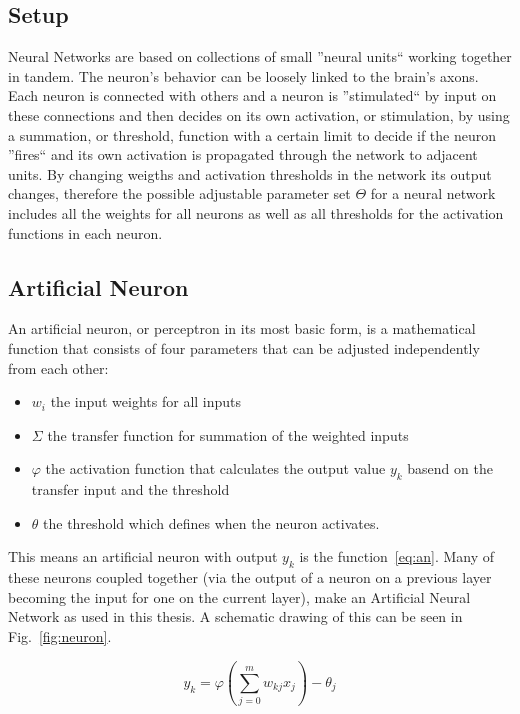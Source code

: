 \subsection{Setup}
\label{sec:fund:general}
Neural Networks are based on collections of small ''neural units``  working together in tandem. The neuron's behavior can be loosely linked to the brain's axons. Each neuron is connected with others and a neuron is ''stimulated`` by input on these connections and then decides on its own activation, or stimulation, by using a summation, or threshold, function with a certain limit to decide if the neuron ''fires`` and its own activation is propagated through the network to adjacent units. By changing weigths and activation thresholds in the network its output changes, therefore the possible adjustable parameter set \(\Theta\) for a neural network includes all the weights for all neurons as well as all thresholds for the activation functions in each neuron.

\subsection{Artificial Neuron}
\label{sec:fund:AN}

An artificial neuron, or perceptron in its most basic form, is a mathematical function that consists of four parameters that can be adjusted independently from each other:
\begin{itemize}
\item \(w_i\) the input weights for all inputs
\item \(\Sigma\) the transfer function for summation of the weighted inputs
\item \(\varphi\) the activation function that calculates the output value \(y_k\) basend on the transfer input and the threshold
\item \(\theta\) the threshold which defines when the neuron activates.
\end{itemize}

This means an artificial neuron with output \(y_k\) is the function~\ref{eq:an}. Many of these neurons coupled together (via the output of a neuron on a previous layer becoming the input for one on the current layer), make an Artificial Neural Network as used in this thesis. A schematic drawing of this can be seen in Fig.~\ref{fig:neuron}.

\begin{equation}
y_k = \varphi(\sum_{j=0}^{m} w_{kj}x_j) - \theta_j
\label{eq:an}
\end{equation}

